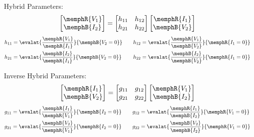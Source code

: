 \begin{multicols}{2}
\begin{CheatsheetEntryFrameStart}
        Hybrid Parameters:
        \begin{equation*}
            \begin{bmatrix}
                \memphR{V_1} \\
                \memphB{I_2}
            \end{bmatrix}
            =
            \begin{bmatrix}
                h_{11} & h_{12} \\
                h_{21} & h_{22}
            \end{bmatrix}
            \begin{bmatrix}
                \memphR{I_1} \\
                \memphB{V_2}
            \end{bmatrix}
        \end{equation*}
        \begin{align*}
            h_{11} &= \evalat{\frac{\memphR{V_1}}{\memphR{I_1}}}{\memphB{V_2 = 0}} \quad &
            h_{12} &= \evalat{\frac{\memphR{V_1}}{\memphB{V_2}}}{\memphR{I_1 = 0}} \\
            h_{21} &= \evalat{\frac{\memphB{I_2}}{\memphR{I_1}}}{\memphB{V_2 = 0}} \quad &
            h_{22} &= \evalat{\frac{\memphB{I_2}}{\memphB{V_2}}}{\memphR{I_1 = 0}}
        \end{align*}

        Inverse Hybrid Parameters:
        \begin{equation*}
            \begin{bmatrix}
                \memphR{I_1} \\
                \memphB{V_2}
            \end{bmatrix}
            =
            \begin{bmatrix}
                g_{11} & g_{12} \\
                g_{21} & g_{22}
            \end{bmatrix}
            \begin{bmatrix}
                \memphR{V_1} \\
                \memphB{I_2}
            \end{bmatrix}
        \end{equation*}
        \begin{align*}
            g_{11} &= \evalat{\frac{\memphR{I_1}}{\memphR{V_1}}}{\memphB{I_2 = 0}} \quad &
            g_{12} &= \evalat{\frac{\memphR{I_1}}{\memphB{I_2}}}{\memphR{V_1 = 0}} \\
            g_{21} &= \evalat{\frac{\memphB{V_2}}{\memphR{V_1}}}{\memphB{I_2 = 0}} \quad &
            g_{22} &= \evalat{\frac{\memphB{V_2}}{\memphB{I_2}}}{\memphR{V_1 = 0}}
        \end{align*}
        \vspace*{-6mm} %


\end{CheatsheetEntryFrameStart}
\end{multicols}
